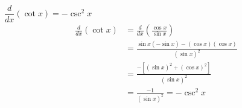 {$\dfrac{d}{dx}(\cot x) = -\csc^2 x$}
{\begin{align*}
\frac{d}{dx}(\cot x)
&=\frac{d}{dx}\left(\frac{\cos x}{\sin x}\right)\\
&=\frac{\sin x (-\sin x) - (\cos x)(\cos x)}{(\sin x)^2}\\
&=\frac{-[(\sin x)^2 + (\cos x)^2]}{(\sin x)^2}\\
&=\frac{-1}{(\sin x)^2} = -\csc^2 x
\end{align*}}
